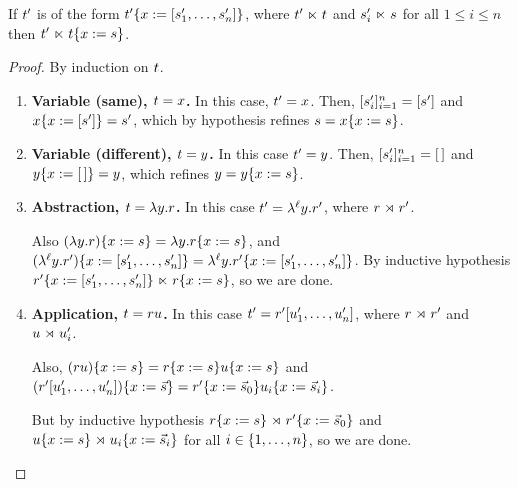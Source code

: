 
\begin{lemma}
If $t'$ is of the form $t'\{x := [s_1', \hdots, s_n']\}$,
where $t' \mathrel{\ltimes} t$ and $s'_i \mathrel{\ltimes} s$ for all $1 \leq i \leq n$
then $t' \mathrel{\ltimes} t\{x := s\}$.
\end{lemma}
\begin{proof}
  By induction on $t$.
  \begin{enumerate}
  \item {\bf Variable (same), $t = x$.} In this case, $t' = x$.
    Then, $[s'_i]_{i=1}^{n} = [s']$
      and $x\{x := [s']\} = s'$,
      which by hypothesis refines $s = x\{x := s\}$.
  \item {\bf Variable (different), $t = y$.} In this  case $t' = y$.
    Then, $[s'_i]_{i=1}^{n} = [\,]$
      and $y\{x := [\,]\} = y$,
      which refines $y = y\{x := s\}$.
  \item {\bf Abstraction, $t = \lambda y. r$.}
    In this case $t' = \lambda^{\ell} y. r'$,
      where $r \mathrel{\rtimes} r'$.

    Also $(\lambda y. r)\{x := s\} = \lambda y. r\{x := s\}$,
    and $(\lambda^{\ell} y. r')\{x := [s_1', \hdots, s_n']\} =
         \lambda^{\ell} y. r'\{x := [s_1', \hdots, s_n']\}$.
    By inductive hypothesis $r'\{x := [s_1', \hdots, s_n']\} \mathrel{\ltimes} r\{x := s\}$,
    so we are done.
  \item {\bf Application, $t = r u$.}
    In this case $t' = r' [u'_1, \hdots, u'_n]$,
      where $r \mathrel{\rtimes} r'$
      and $u \mathrel{\rtimes} u'_i$.

    Also, $(r u)\{x := s\} =
             r\{x := s\} u\{x := s\}$
    and $(r' [u'_1, \hdots, u'_n])\{x := \vec{s}\}
           = r'\{x := \vec{s}_0\} u_i\{x := \vec{s}_i\}$.

    But by inductive hypothesis
      $r\{x := s\} \mathrel{\rtimes} r'\{x := \vec{s}_0\}$
      and $u\{x := s\} \mathrel{\rtimes} u_i\{x := \vec{s}_i\}$
        for all $i \in \{1, \hdots, n\}$,
    so we are done.
  \end{enumerate}
\end{proof}

